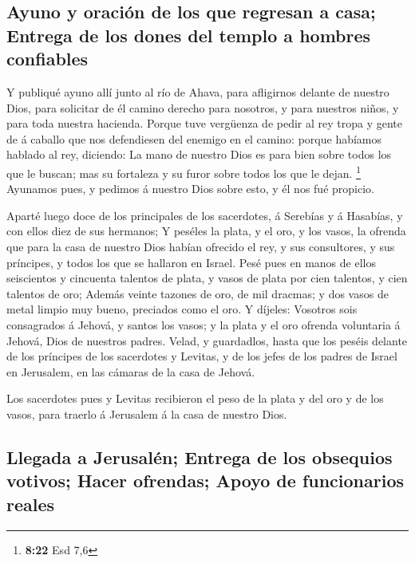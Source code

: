 \hypertarget{ayuno-y-oraciuxf3n-de-los-que-regresan-a-casa-entrega-de-los-dones-del-templo-a-hombres-confiables}{%
\subsection{Ayuno y oración de los que regresan a casa; Entrega de los
dones del templo a hombres
confiables}\label{ayuno-y-oraciuxf3n-de-los-que-regresan-a-casa-entrega-de-los-dones-del-templo-a-hombres-confiables}}

 Y publiqué ayuno allí junto al río de Ahava, para
afligirnos delante de nuestro Dios, para solicitar de él camino derecho
para nosotros, y para nuestros niños, y para toda nuestra hacienda.
 Porque tuve vergüenza de pedir al rey tropa y gente de á
caballo que nos defendiesen del enemigo en el camino: porque habíamos
hablado al rey, diciendo: La mano de nuestro Dios es para bien sobre
todos los que le buscan; mas su fortaleza y su furor sobre todos los que
le dejan. \footnote{\textbf{8:22} Esd 7,6}  Ayunamos
pues, y pedimos á nuestro Dios sobre esto, y él nos fué propicio.

 Aparté luego doce de los principales de los sacerdotes,
á Serebías y á Hasabías, y con ellos diez de sus hermanos;
 Y peséles la plata, y el oro, y los vasos, la ofrenda
que para la casa de nuestro Dios habían ofrecido el rey, y sus
consultores, y sus príncipes, y todos los que se hallaron en Israel.
 Pesé pues en manos de ellos seiscientos y cincuenta
talentos de plata, y vasos de plata por cien talentos, y cien talentos
de oro;  Además veinte tazones de oro, de mil dracmas; y
dos vasos de metal limpio muy bueno, preciados como el oro.
 Y díjeles: Vosotros sois consagrados á Jehová, y santos
los vasos; y la plata y el oro ofrenda voluntaria á Jehová, Dios de
nuestros padres.  Velad, y guardadlos, hasta que los
peséis delante de los príncipes de los sacerdotes y Levitas, y de los
jefes de los padres de Israel en Jerusalem, en las cámaras de la casa de
Jehová.

 Los sacerdotes pues y Levitas recibieron el peso de la
plata y del oro y de los vasos, para traerlo á Jerusalem á la casa de
nuestro Dios.

\hypertarget{llegada-a-jerusaluxe9n-entrega-de-los-obsequios-votivos-hacer-ofrendas-apoyo-de-funcionarios-reales}{%
\subsection{Llegada a Jerusalén; Entrega de los obsequios votivos; Hacer
ofrendas; Apoyo de funcionarios
reales}\label{llegada-a-jerusaluxe9n-entrega-de-los-obsequios-votivos-hacer-ofrendas-apoyo-de-funcionarios-reales}}

